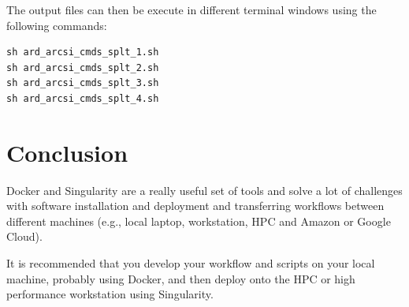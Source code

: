\documentclass[authoryear, 11pt, oneside]{report}
\begin{document}
The output files can then be execute in different terminal windows using the following commands:
\begin{verbatim}
sh ard_arcsi_cmds_splt_1.sh
sh ard_arcsi_cmds_splt_2.sh
sh ard_arcsi_cmds_splt_3.sh
sh ard_arcsi_cmds_splt_4.sh
\end{verbatim}

\chapter{Conclusion}

Docker and Singularity are a really useful set of tools and solve a lot of challenges with software installation and deployment and transferring workflows between different machines (e.g., local laptop, workstation, HPC and Amazon or Google Cloud).

It is recommended that you develop your workflow and scripts on your local machine, probably using Docker, and then deploy onto the HPC or high performance workstation using Singularity.
\end{document}
